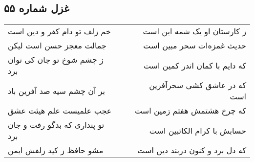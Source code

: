 \begin{center}
\section*{غزل شماره ۵۵}
\label{sec:sh055}
\begin{longtable}{l p{0.5cm} r}
خم زلف تو دام کفر و دین است
&&
ز کارستان او یک شمه این است
\\
جمالت معجز حسن است لیکن
&&
حدیث غمزه‌ات سحر مبین است
\\
ز چشم شوخ تو جان کی توان برد
&&
که دایم با کمان اندر کمین است
\\
بر آن چشم سیه صد آفرین باد
&&
که در عاشق کشی سحرآفرین است
\\
عجب علمیست علم هیئت عشق
&&
که چرخ هشتمش هفتم زمین است
\\
تو پنداری که بدگو رفت و جان برد
&&
حسابش با کرام الکاتبین است
\\
مشو حافظ ز کید زلفش ایمن
&&
که دل برد و کنون دربند دین است
\\
\end{longtable}
\end{center}
